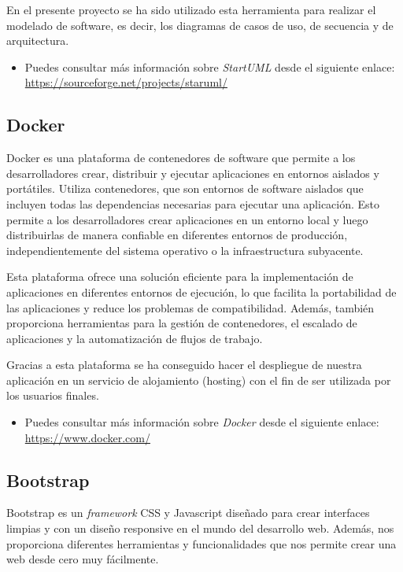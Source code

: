 En el presente proyecto se ha sido utilizado esta herramienta para realizar el modelado de software, es decir, los diagramas de casos de uso, de secuencia y de arquitectura. 

\begin{itemize}
    \item Puedes consultar más información sobre  \textit{StartUML}  desde el siguiente enlace: \url{https://sourceforge.net/projects/staruml/}
\end{itemize}

\subsection{Docker} \label{DOCKER}
Docker es una plataforma de contenedores de software que permite a los desarrolladores crear, distribuir y ejecutar aplicaciones en entornos aislados y portátiles. Utiliza contenedores, que son entornos de software aislados que incluyen todas las dependencias necesarias para ejecutar una aplicación. Esto permite a los desarrolladores crear aplicaciones en un entorno local y luego distribuirlas de manera confiable en diferentes entornos de producción, independientemente del sistema operativo o la infraestructura subyacente. 


Esta plataforma ofrece una solución eficiente para la implementación de aplicaciones en diferentes entornos de ejecución, lo que facilita la portabilidad de las aplicaciones y reduce los problemas de compatibilidad. Además, también proporciona herramientas para la gestión de contenedores, el escalado de aplicaciones y la automatización de flujos de trabajo.

Gracias a esta plataforma se ha conseguido hacer el despliegue de nuestra aplicación en un servicio de alojamiento (hosting) con el fin de ser utilizada por los usuarios finales.

\begin{itemize}
    \item Puedes consultar más información sobre \textit{Docker}  desde el siguiente enlace: \url{https://www.docker.com/}
\end{itemize}

\subsection{Bootstrap} \label{BOOTSTRAP}
Bootstrap es un \textit{framework} CSS y Javascript diseñado para crear interfaces limpias y con un diseño responsive en el mundo del desarrollo web. Además, nos proporciona diferentes herramientas y funcionalidades que nos permite crear una web desde cero muy fácilmente.

